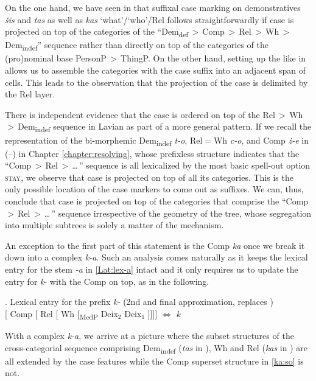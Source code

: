 On the one hand, we have seen in  that suffixal case marking on demonstratives \textit{\v{s}is} and \textit{tas} as well as \textit{kas} `what'/`who'/Rel follows straightforwardly if case is projected on top of the categories of the ``Dem\textsubscript{def}\,$>$\,Comp\,$>$\,Rel\,$>$\,Wh\,$>$ Dem\textsubscript{indef}'' sequence rather than directly on top of the categories of the (pro)no\-mi\-nal base PersonP\,$>$\,ThingP.
On the other hand, setting up the  like in  allows us to assemble the categories with the case suffix into an adjacent span of cells. This leads to the observation that the projection of the case is delimited by the Rel layer. 
\par
There is independent evidence that the case  is ordered on top of the Rel\,$>$\,Wh\,$>$\,Dem\textsubscript{indef} sequence in Lavian as part of a more general pattern. 
If we recall the representation of the  bi-morphemic Dem\textsubscript{indef} \textit{t-o}, Rel$=$Wh \textit{c-o}, and Comp \textit{\.z-e} in (--) in Chapter \ref{chapter:resolving}, whose prefixless structure indicates that the ``Comp\,$>$\,Rel\,$>$\,\ldots \,'' sequence is all lexicalized by the most basic spell-out option \textsc{stay}, we observe that case is projected on top of all its categories. This is the only possible location of the case markers to come out as suffixes. 
We can, thus, conclude that case is projected on top of the categories that comprise the ``Comp\,$>$\,Rel\,$>$\,\ldots \,'' sequence irrespective of the geometry of the tree, whose segregation into multiple subtrees is solely a matter of the  mechanism. 
\par
An exception to the first part of this statement is the  Comp \textit{ka} once we break it down into a complex \textit{k-a}. Such an analysis comes naturally as it keeps the lexical entry for the stem \textit{-a} in \ref{Lat:lex-a} intact and it only requires us to update the entry for \textit{k}- with the Comp  on top, as in the following.

\ex. Lexical entry for the  prefix \textit{k-} (2nd and final approximation, replaces )\label{Lat:lex:k}\\[0.5ex]
[ Comp [ Rel [ Wh [\textsubscript{MedP} Deix$_{2}$ Deix$_{1}$ ]]]] $\Leftrightarrow$ \textit{k}

With a complex \textit{k-a}, we arrive at a picture where the subset structures of the cross-categorial sequence comprising Dem\textsubscript{indef} (\textit{tas} in ), Wh and Rel (\textit{kas} in ) are all extended by the case features while the Comp superset structure in \ref{ka:so} is not.\largerpage

